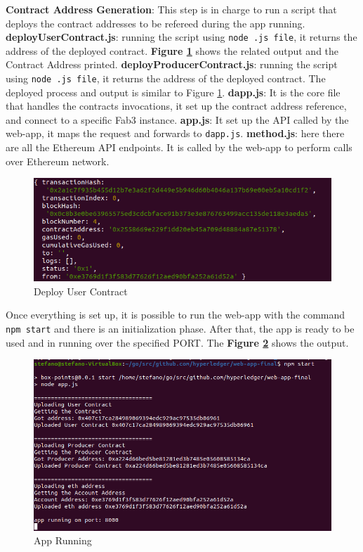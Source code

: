 \begin{outline}[enumerate]
    \1 \textbf{Contract Address Generation}:
    \2 This step is in charge to run a script that deploys the contract addresses to be refereed during the 
    app running.
    \3 \textbf{deployUserContract.js}: running the script using \texttt{node .js file}, it returns the address of the 
    deployed contract. \textbf{Figure \ref{fig:deploy-user-contract}} shows the related output and the Contract 
    Address printed. 
    \3 \textbf{deployProducerContract.js}: running the script using \texttt{node .js file}, it returns the address of 
    the deployed contract. The deployed process and output is similar to Figure \ref{fig:deploy-user-contract}.
    \1  \textbf{dapp.js}: It is the core file that handles the contracts invocations, it set up the contract address 
    reference, and connect to a specific Fab3 instance.
    \1 \textbf{app.js}: It set up the API called by the web-app, it maps the request and forwards to \texttt{dapp.js}.
    \1 \textbf{method.js}: here there are all the Ethereum API endpoints. It is called by the web-app to perform 
    calls over Ethereum network. 
\end{outline}

\begin{figure}[h!]
    \centering
    \includegraphics[totalheight=4cm]{img/app-running/deployUserContract.png}
    \caption{Deploy User Contract}
    \label{fig:deploy-user-contract}
\end{figure}

Once everything is set up, it is possible to run the web-app with the command \texttt{npm start} and there is an initialization
phase. After that, the app is ready to be used and in running over the specified PORT. The \textbf{Figure \ref{fig:app-running}}
shows the output. 

\begin{figure}[h!]
    \centering
    \includegraphics[totalheight=6cm]{img/app-running/app-running.png}
    \caption{App Running}
    \label{fig:app-running}
\end{figure}

